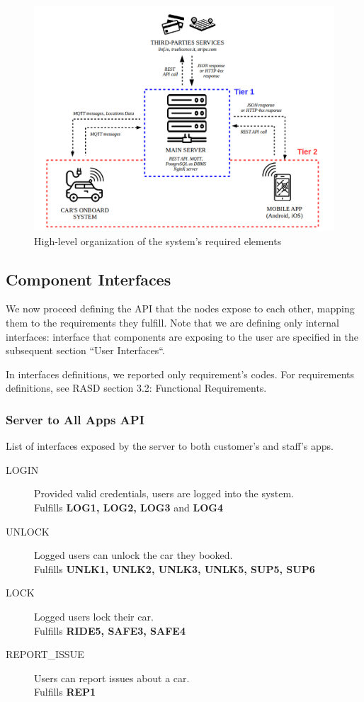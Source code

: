 \documentclass[11pt]{article} %
\begin{document}
\begin{description}
\begin{figure}[H]
	\centering
	\includegraphics[width=1\textwidth]{proposed_system.png}
	\caption{High-level organization of the system's required elements}
\end{figure}





\subsection{Component Interfaces}

We now proceed defining the API that the nodes expose to each other, mapping them to the requirements they fulfill. Note that we are defining only internal interfaces: interface that components are exposing to the user are specified in the subsequent section ``User Interfaces``.

In interfaces definitions, we reported only requirement's codes. For requirements definitions, see RASD section 3.2: Functional Requirements.

\subsubsection{Server to All Apps API }
List of interfaces exposed by the server to both customer's and staff's apps.
\begin{description}
	\item[LOGIN] Provided valid credentials, users are logged into the system. \\ Fulfills \textbf{LOG1, LOG2, LOG3} and \textbf{LOG4}
	\item[UNLOCK] Logged users can unlock the car they booked. \\ Fulfills \textbf{UNLK1, UNLK2, UNLK3, UNLK5, SUP5, SUP6}	
	\item[LOCK] Logged users lock their car. \\ Fulfills \textbf{RIDE5, SAFE3, SAFE4}
	\item[REPORT\_ISSUE] Users can report issues about a car. \\ Fulfills \textbf{REP1}
\end{description}



\end{description}
\end{document}
